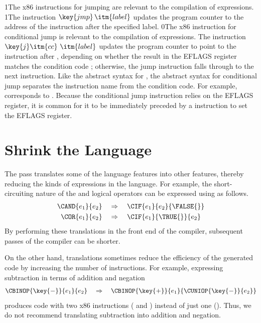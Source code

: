 \documentclass[7x10]{TimesAPriori_MIT}%
\def\racketEd{0}
\def\pythonEd{1}
\providecommand{\BookEdition}{1}
\let\edition\BookEdition
\newcommand{\racket}[1]{{\if\edition\racketEd{#1}\fi}}
\newcommand{\pythonColor}[0]{}
\newcommand{\python}[1]{{\if\edition\pythonEd\pythonColor #1\fi}}
\numberwithin{theorem}{chapter}
\numberwithin{definition}{chapter}
\numberwithin{equation}{chapter}
\begin{document}
\python{The x86 instructions for jumping are relevant to the
  compilation of \key{if} expressions.}
%
\python{The instruction $\key{jmp}\,\itm{label}$ updates the program
  counter to the address of the instruction after the specified
  label.}
%
\racket{The x86 instruction for conditional jump is relevant to the
  compilation of \key{if} expressions.}
%
The instruction $\key{j}\itm{cc}~\itm{label}$ updates the program
counter to point to the instruction after , depending on
whether the result in the EFLAGS register matches the condition code
; otherwise, the jump instruction falls through to the next
instruction.  Like the abstract syntax for , the abstract
syntax for conditional jump separates the instruction name from the
condition code. For example, 
corresponds to .  Because the conditional jump instruction
relies on the EFLAGS register, it is common for it to be immediately preceded by
a  instruction to set the EFLAGS register.


\section{Shrink the \LangIf{} Language}
\label{sec:shrink-Lif}

The  pass translates some of the language features into
other features, thereby reducing the kinds of expressions in the
language. For example, the short-circuiting nature of the 
and  logical operators can be expressed using  as
follows.
\begin{align*}
  \CAND{e_1}{e_2} & \quad \Rightarrow \quad \CIF{e_1}{e_2}{\FALSE{}}\\
  \COR{e_1}{e_2} & \quad \Rightarrow \quad \CIF{e_1}{\TRUE{}}{e_2}
\end{align*}
By performing these translations in the front end of the compiler,
subsequent passes of the compiler can be shorter.

On the other hand, translations sometimes reduce the efficiency of the
generated code by increasing the number of instructions. For example,
expressing subtraction in terms of addition and negation
\[
\CBINOP{\key{-}}{e_1}{e_2} \quad \Rightarrow \quad
  \CBINOP{\key{+}}{e_1}{ \CUNIOP{\key{-}}{e_2} }
\]
produces code with two x86 instructions ( and )
instead of just one (). Thus, we do not recommend
translating subtraction into addition and negation.
\end{document}
